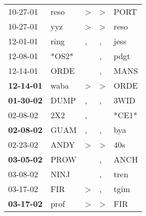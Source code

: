 \begin{supertabular}{p{0.07\textwidth}p{0.06\textwidth}p{0.02\textwidth}p{0.02\textwidth}p{0.06\textwidth}}
          10-27-01\textsuperscript{} &           reso\textsuperscript{} &     \textgreater &     \textgreater &           PORT\textsuperscript{} \\
          10-27-01\textsuperscript{} &            yyz\textsuperscript{} &     \textgreater &     \textgreater &           reso\textsuperscript{} \\
          12-01-01\textsuperscript{} &           ring\textsuperscript{} &                , &                , &           jess\textsuperscript{} \\
          12-08-01\textsuperscript{} &                            *OS2* &                  &                , &           pdgt\textsuperscript{} \\
          12-14-01\textsuperscript{} &           ORDE\textsuperscript{} &                  &                , &           MANS\textsuperscript{} \\
 \textbf{12-14-01\textsuperscript{}} &           waba\textsuperscript{} &     \textgreater &     \textgreater &           ORDE\textsuperscript{} \\
 \textbf{01-30-02\textsuperscript{}} &           DUMP\textsuperscript{} &                , &                , &           3WID\textsuperscript{} \\
          02-08-02\textsuperscript{} &            2X2\textsuperscript{} &                , &                  &                            *CE1* \\
 \textbf{02-08-02\textsuperscript{}} &           GUAM\textsuperscript{} &                , &                , &            bya\textsuperscript{} \\
          02-23-02\textsuperscript{} &           ANDY\textsuperscript{} &     \textgreater &     \textgreater &            40s\textsuperscript{} \\
 \textbf{03-05-02\textsuperscript{}} &           PROW\textsuperscript{} &                  &                , &           ANCH\textsuperscript{} \\
          03-08-02\textsuperscript{} &           NINJ\textsuperscript{} &                  &                , &           tren\textsuperscript{} \\
          03-17-02\textsuperscript{} &            FIR\textsuperscript{} &     \textgreater &                , &           tgim\textsuperscript{} \\
 \textbf{03-17-02\textsuperscript{}} &           prof\textsuperscript{} &     \textgreater &     \textgreater &            FIR\textsuperscript{} \\

\end{supertabular}
